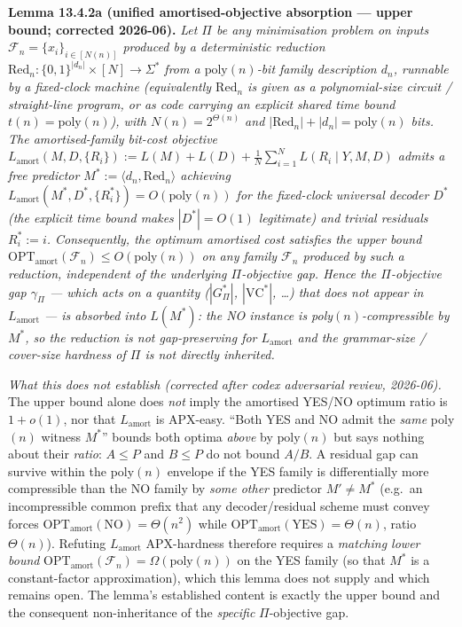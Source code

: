 \documentclass[
]{article}
\begin{document}
\begin{enumerate}
\textbf{Lemma 13.4.2a (unified amortised-objective absorption ---
upper bound; corrected 2026-06).}
\emph{Let $\Pi$ be any minimisation problem on inputs
$\mathcal{F}_n = \{x_i\}_{i \in [N(n)]}$ produced by a
deterministic reduction $\mathrm{Red}_n:
\{0,1\}^{|d_n|} \times [N] \to \Sigma^*$ from a
$\mathrm{poly}(n)$-bit family description $d_n$, runnable by a
\emph{fixed-clock} machine (equivalently $\mathrm{Red}_n$ is given
as a polynomial-size circuit / straight-line program, or as code
carrying an explicit shared time bound $t(n) = \mathrm{poly}(n)$),
with $N(n) = 2^{\Theta(n)}$ and $|\mathrm{Red}_n| + |d_n| =
\mathrm{poly}(n)$ bits. The amortised-family bit-cost objective
$L_{\mathrm{amort}}(M, D, \{R_i\}) := L(M) + L(D) +
\frac{1}{N}\sum_{i=1}^N L(R_i \mid Y, M, D)$
admits a free predictor $M^* := \langle d_n, \mathrm{Red}_n
\rangle$ achieving $L_{\mathrm{amort}}(M^*, D^*, \{R_i^*\}) =
O(\mathrm{poly}(n))$ for the fixed-clock universal decoder $D^*$
(the explicit time bound makes $|D^*| = O(1)$ legitimate) and
trivial residuals $R_i^* := i$. Consequently, the optimum
amortised cost satisfies the \emph{upper bound}
$\mathrm{OPT}_{\mathrm{amort}}(\mathcal{F}_n)
\leq O(\mathrm{poly}(n))$ on any family $\mathcal{F}_n$
produced by such a reduction, \emph{independent of} the
underlying $\Pi$-objective gap. Hence the $\Pi$-objective gap
$\gamma_\Pi$ --- which acts on a quantity ($|G^*_\Pi|$,
$|\mathrm{VC}^*|$, \dots) that does not appear in
$L_{\mathrm{amort}}$ --- is \emph{absorbed into $L(M^*)$}: the NO
instance is poly$(n)$-compressible by $M^*$, so the reduction is
not gap-preserving for $L_{\mathrm{amort}}$ and the grammar-size /
cover-size hardness of $\Pi$ is not directly inherited.}

\emph{What this does \emph{not} establish (corrected after codex
adversarial review, 2026-06).} The upper bound alone does
\emph{not} imply the amortised YES/NO optimum ratio is $1 + o(1)$,
nor that $L_{\mathrm{amort}}$ is APX-easy. ``Both YES and NO admit
the \emph{same} poly$(n)$ witness $M^*$'' bounds both optima
\emph{above} by $\mathrm{poly}(n)$ but says nothing about their
\emph{ratio}: $A \leq P$ and $B \leq P$ do not bound $A/B$. A
residual gap can survive within the poly$(n)$ envelope if the YES
family is differentially more compressible than the NO family by
\emph{some other} predictor $M' \neq M^*$ (e.g.\ an incompressible
common prefix that any decoder/residual scheme must convey forces
$\mathrm{OPT}_{\mathrm{amort}}(\text{NO}) = \Theta(n^2)$ while
$\mathrm{OPT}_{\mathrm{amort}}(\text{YES}) = \Theta(n)$, ratio
$\Theta(n)$). Refuting $L_{\mathrm{amort}}$ APX-hardness therefore
requires a \emph{matching lower bound} $\mathrm{OPT}_{\mathrm{amort}}
(\mathcal{F}_n) = \Omega(\mathrm{poly}(n))$ on the YES family
(so that $M^*$ is a constant-factor approximation), which this
lemma does not supply and which remains open. The lemma's
established content is exactly the upper bound and the consequent
non-inheritance of the \emph{specific} $\Pi$-objective gap.


\end{enumerate}
\end{document}
